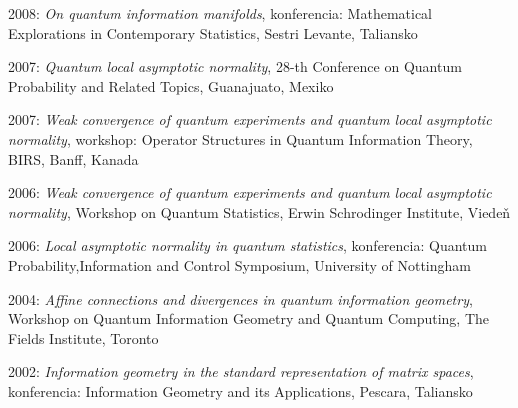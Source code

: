 \documentclass[12pt]{article}
\begin{document}
\begin{description}[noitemsep,leftmargin=1.3cm, font=\normalfont]
\item{2008:} \emph{On quantum information manifolds}, konferencia:  Mathematical Explorations in Contemporary Statistics,  Sestri Levante, Taliansko
\item{2007:} \emph{Quantum local asymptotic normality}, 28-th Conference on Quantum Probability and Related Topics,  Guanajuato,
Mexiko
\item{2007:} \emph{Weak convergence of quantum experiments and quantum local asymptotic
normality}, workshop: Operator Structures in Quantum Information Theory, BIRS, Banff, Kanada
\item{2006: }  \emph{Weak convergence of quantum experiments and quantum local asymptotic
normality}, Workshop on Quantum Statistics,  Erwin Schrodinger Institute, Viedeň
\item{2006: } \emph{Local asymptotic normality in quantum statistics}, konferencia: Quantum Probability,Information and Control Symposium, University of Nottingham

\item{2004:}  \emph{Affine connections and divergences in quantum information geometry}, 
 Workshop on Quantum Information Geometry and Quantum Computing, The Fields
Institute, Toronto

\item{2002:} \emph{Information geometry in the standard representation of matrix spaces}, konferencia: Information Geometry and its Applications, Pescara, Taliansko




 




\end{description}
\end{document}
